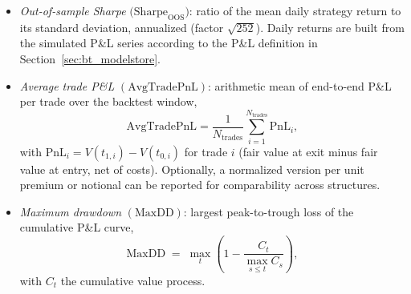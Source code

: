 \documentclass[12pt,a4paper]{report}
\begin{document}
\begin{itemize}
        \item \emph{Out-of-sample Sharpe} $\big(\mathrm{Sharpe}_{\text{OOS}}\big)$: ratio of the mean daily strategy return to its standard deviation, annualized (factor $\sqrt{252}$). Daily returns are built from the simulated P\&L series according to the P\&L definition in Section~\ref{sec:bt_modelstore}.
        \item \emph{Average trade P\&L} $(\mathrm{AvgTradePnL})$: arithmetic mean of end-to-end P\&L per trade over the backtest window,
        \[
        \mathrm{AvgTradePnL}=\frac{1}{N_{\text{trades}}}\sum_{i=1}^{N_{\text{trades}}}\mathrm{PnL}_i,
        \]
        with $\mathrm{PnL}_i=V(t_{1,i})-V(t_{0,i})$ for trade $i$ (fair value at exit minus fair value at entry, net of costs). Optionally, a normalized version per unit premium or notional can be reported for comparability across structures.
        
        \item \emph{Maximum drawdown} $(\mathrm{MaxDD})$: largest peak-to-trough loss of the cumulative P\&L curve,
        \[
        \mathrm{MaxDD} \;=\; \max_{t}\left(1-\frac{C_t}{\max_{s\le t} C_s}\right),
        \]
        with $C_t$ the cumulative value process.
        

\end{itemize}
\end{document}
